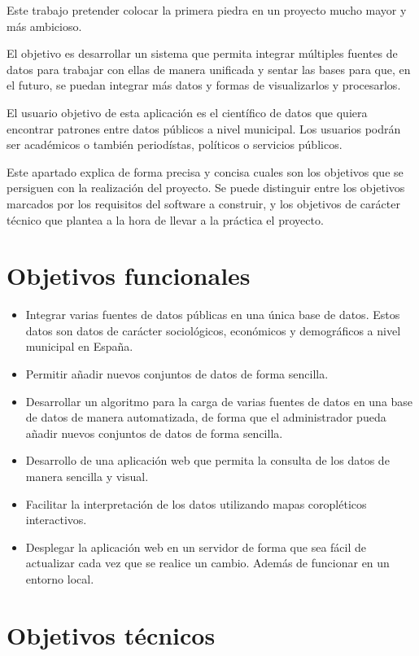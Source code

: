 
Este trabajo pretender colocar la primera piedra en un proyecto mucho mayor y más ambicioso.

El objetivo es desarrollar un sistema que permita integrar múltiples fuentes de datos para trabajar con ellas de manera unificada y sentar las bases para que, en el futuro, se puedan integrar más datos y formas de visualizarlos y procesarlos.

El usuario objetivo de esta aplicación es el científico de datos que quiera encontrar patrones entre datos públicos a nivel  municipal. Los usuarios podrán ser académicos o también periodístas, políticos o servicios públicos.

Este apartado explica de forma precisa y concisa cuales son los objetivos que se persiguen con la realización del proyecto. Se puede distinguir entre los objetivos marcados por los requisitos del software a construir, y los objetivos de carácter técnico que plantea a la hora de llevar a la práctica el proyecto.

\section{Objetivos funcionales}

\begin{itemize}
	\item Integrar varias fuentes de datos públicas en una única base de datos. Estos datos son datos de carácter sociológicos, económicos y demográficos a nivel municipal en España.
	\item Permitir añadir nuevos conjuntos de datos de forma sencilla.
	\item Desarrollar un algoritmo para la carga de varias fuentes de datos en una base de datos de manera automatizada, de forma que el administrador pueda añadir nuevos conjuntos de datos de forma sencilla.
	\item Desarrollo de una aplicación web que permita la consulta de los datos de manera sencilla y visual.
	\item Facilitar la interpretación de los datos utilizando mapas coropléticos interactivos.
	\item Desplegar la aplicación web en un servidor de forma que sea fácil de actualizar cada vez que se realice un cambio. Además de funcionar en un entorno local.
\end{itemize}

\section{Objetivos técnicos}

